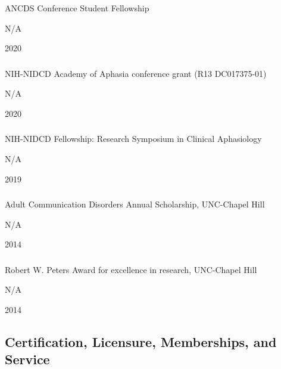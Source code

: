 \documentclass[
]{article}
\begin{document}
ANCDS Conference Student Fellowship

N/A

2020

\hypertarget{section-31}{%
\subsubsection{}\label{section-31}}

NIH-NIDCD Academy of Aphasia conference grant (R13 DC017375-01)

N/A

2020

\hypertarget{section-32}{%
\subsubsection{}\label{section-32}}

NIH-NIDCD Fellowship: Research Symposium in Clinical Aphasiology

N/A

2019

\hypertarget{section-33}{%
\subsubsection{}\label{section-33}}

Adult Communication Disorders Annual Scholarship, UNC-Chapel Hill

N/A

2014

\hypertarget{section-34}{%
\subsubsection{}\label{section-34}}

Robert W. Peters Award for excellence in research, UNC-Chapel Hill

N/A

2014

\hypertarget{certification-licensure-memberships-and-service}{%
\subsection{Certification, Licensure, Memberships, and
Service}\label{certification-licensure-memberships-and-service}}

\hypertarget{section-35}{%
\subsubsection{}\label{section-35}}
\end{document}
